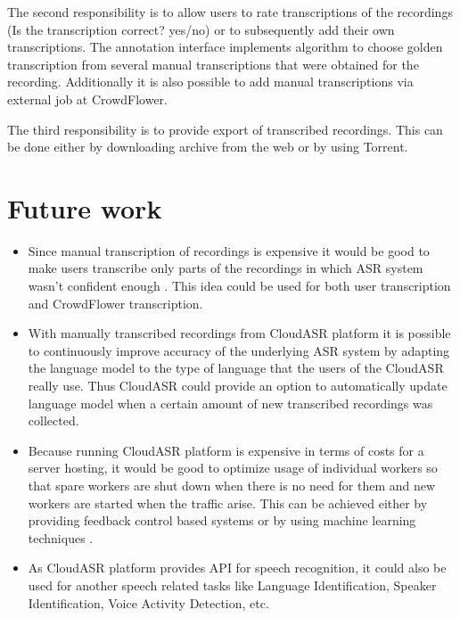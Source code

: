 The second responsibility is to allow users to rate transcriptions of the recordings (Is the transcription correct? yes/no) or to subsequently add their own transcriptions.
The annotation interface implements algorithm to choose golden transcription from several manual transcriptions
  that were obtained for the recording.
Additionally it is also possible to add manual transcriptions via external job at CrowdFlower.

The third responsibility is to provide export of transcribed recordings.
This can be done either by downloading archive from the web or by using Torrent.

\section*{Future work}
\begin{itemize}
  \item
    Since manual transcription of recordings is expensive
      it would be good to make users transcribe only parts of the recordings
      in which ASR system wasn't confident enough \cite{sperber2014fly}.
    This idea could be used for both user transcription and CrowdFlower transcription.

  \item
    With manually transcribed recordings from CloudASR platform
      it is possible to continuously improve accuracy of the underlying ASR system
      by adapting the language model to the type of language that the users of the CloudASR really use.
    Thus CloudASR could provide an option to automatically update language model
      when a certain amount of new transcribed recordings was collected.

  \item
    Because running CloudASR platform is expensive in terms of costs for a server hosting,
      it would be good to optimize usage of individual workers
      so that spare workers are shut down when there is no need for them
      and new workers are started when the traffic arise.
    This can be achieved either by providing feedback control based systems \cite{janert2013feedback}
      or by using machine learning techniques \cite{gong2010press}.

  \item
    As CloudASR platform provides API for speech recognition,
      it could also be used for another speech related tasks like Language Identification, Speaker Identification, Voice Activity Detection, etc.

\end{itemize}


